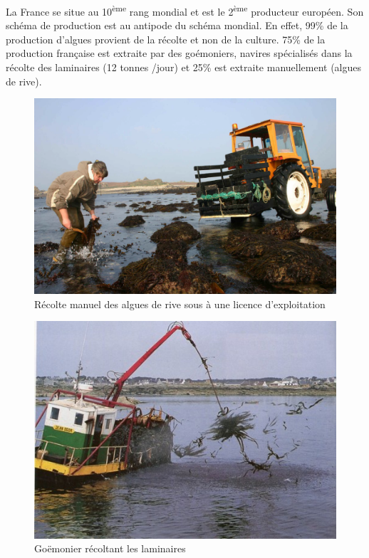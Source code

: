 \documentclass[
]{book}
\begin{document}
La France se situe au 10\textsuperscript{ème} rang mondial et est le 2\textsuperscript{ème} producteur européen. Son schéma de production est au antipode du schéma mondial. En effet, 99\% de la production d'algues provient de la récolte et non de la culture. 75\% de la production française est extraite par des goémoniers, navires spécialisés dans la récolte des laminaires (12 tonnes /jour) et 25\% est extraite manuellement (algues de rive).

\begin{figure}

{\centering \includegraphics[width=14.22in]{images/recoltealguemain} 

}

\caption{Récolte manuel des algues de rive sous à une licence d'exploitation}\label{fig:recoltealguemain}
\end{figure}

\begin{figure}

{\centering \includegraphics[width=6.89in]{images/goemonier} 

}

\caption{Goëmonier récoltant les laminaires}\label{fig:goemonier}
\end{figure}
\end{document}
